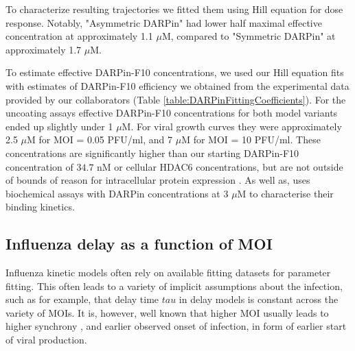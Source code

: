 To characterize resulting trajectories we fitted them using Hill equation for dose response. Notably, "Asymmetric DARPin" had lower half maximal effective concentration at approximately 1.1 $\mu$M, compared to "Symmetric DARPin" at approximately 1.7 $\mu$M.

To estimate effective DARPin-F10 concentrations, we used our Hill equation fits with estimates of DARPin-F10 efficiency we obtained from the experimental data provided by our collaborators \cite{DarpinData} (Table \ref{table:DARPinFittingCoefficients}). For the uncoating assays effective DARPin-F10 concentrations for both model variants ended up slightly under 1 $\mu$M. For viral growth curves they were approximately 2.5 $\mu$M for MOI = 0.05 PFU/ml, and 7 $\mu$M for MOI = 10 PFU/ml. These concentrations are significantly higher than our starting DARPin-F10 concentration of $34.7$ nM or cellular HDAC6 concentrations, but are not outside of bounds of reason for intracellular protein expression \cite{milo_2015}. As well as, \cite{guillard2017structural} uses biochemical assays with DARPin concentrations at 3 $\mu$M to characterise their binding kinetics.

\subsection{Influenza delay as a function of MOI}

Influenza kinetic models often rely on available fitting datasets for parameter fitting. This often leads to a variety of implicit assumptions about the infection, such as for example, that delay time $tau$ in delay models is constant across the variety of MOIs. It is, however, well known that higher MOI usually leads to higher synchrony \cite{cairns1957asynchrony}, and earlier observed onset of infection, in form of earlier start of viral production.

